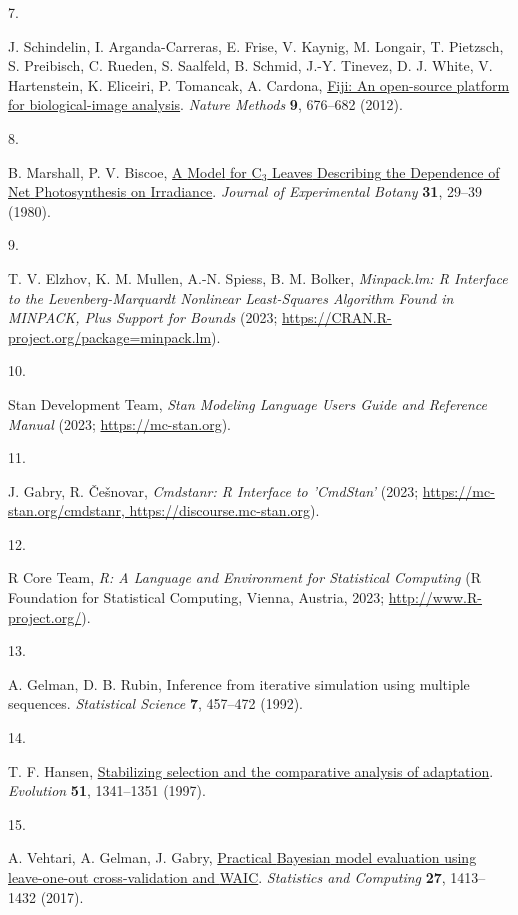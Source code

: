 \documentclass[
  letterpaper,
  DIV=11,
  numbers=noendperiod]{scrartcl}
\newlength{\cslhangindent}
\newlength{\csllabelwidth}
\newenvironment{CSLReferences}[2] %
 {\begin{list}{}{%
  \setlength{\itemindent}{0pt}
  \setlength{\leftmargin}{0pt}
  \setlength{\parsep}{0pt}
  \ifodd #1
   \setlength{\leftmargin}{\cslhangindent}
   \setlength{\itemindent}{-1\cslhangindent}
  \fi
  \setlength{\itemsep}{#2\baselineskip}}}
 {\end{list}}
\newcommand{\CSLLeftMargin}[1]{\parbox[t]{\csllabelwidth}{\strut#1\strut}}
\newcommand{\CSLRightInline}[1]{\parbox[t]{\linewidth - \csllabelwidth}{\strut#1\strut}}
\begin{document}
\begin{CSLReferences}{0}{1}
\CSLLeftMargin{7. }%
\CSLRightInline{J. Schindelin, I. Arganda-Carreras, E. Frise, V. Kaynig,
M. Longair, T. Pietzsch, S. Preibisch, C. Rueden, S. Saalfeld, B.
Schmid, J.-Y. Tinevez, D. J. White, V. Hartenstein, K. Eliceiri, P.
Tomancak, A. Cardona, \href{https://doi.org/10.1038/nmeth.2019}{Fiji: An
open-source platform for biological-image analysis}. \emph{Nature
Methods} \textbf{9}, 676--682 (2012).}

\CSLLeftMargin{8. }%
\CSLRightInline{B. Marshall, P. V. Biscoe,
\href{https://doi.org/10.1093/jxb/31.1.29}{A {Model} for
{C}\(_{\textrm{3}}\) {Leaves} {Describing} the {Dependence} of {Net}
{Photosynthesis} on {Irradiance}}. \emph{Journal of Experimental Botany}
\textbf{31}, 29--39 (1980).}

\CSLLeftMargin{9. }%
\CSLRightInline{T. V. Elzhov, K. M. Mullen, A.-N. Spiess, B. M. Bolker,
\emph{Minpack.lm: {R} {Interface} to the {Levenberg}-{Marquardt}
{Nonlinear} {Least}-{Squares} {Algorithm} {Found} in {MINPACK}, {Plus}
{Support} for {Bounds}} (2023;
\url{https://CRAN.R-project.org/package=minpack.lm}).}

\CSLLeftMargin{10. }%
\CSLRightInline{Stan Development Team, \emph{Stan {Modeling} {Language}
{Users} {Guide} and {Reference} {Manual}} (2023;
\url{https://mc-stan.org}).}

\CSLLeftMargin{11. }%
\CSLRightInline{J. Gabry, R. Češnovar, \emph{Cmdstanr: {R} {Interface}
to '{CmdStan}'} (2023;
\href{https://mc-stan.org/cmdstanr,\%20https://discourse.mc-stan.org}{https://mc-stan.org/cmdstanr,
https://discourse.mc-stan.org}).}

\CSLLeftMargin{12. }%
\CSLRightInline{R Core Team, \emph{R: {A} {Language} and {Environment}
for {Statistical} {Computing}} (R Foundation for Statistical Computing,
Vienna, Austria, 2023; \url{http://www.R-project.org/}).}

\CSLLeftMargin{13. }%
\CSLRightInline{A. Gelman, D. B. Rubin, Inference from iterative
simulation using multiple sequences. \emph{Statistical Science}
\textbf{7}, 457--472 (1992).}

\CSLLeftMargin{14. }%
\CSLRightInline{T. F. Hansen,
\href{https://doi.org/10.1111/j.1558-5646.1997.tb01457.x}{Stabilizing
selection and the comparative analysis of adaptation}. \emph{Evolution}
\textbf{51}, 1341--1351 (1997).}

\CSLLeftMargin{15. }%
\CSLRightInline{A. Vehtari, A. Gelman, J. Gabry,
\href{https://doi.org/10.1007/s11222-016-9696-4}{Practical {Bayesian}
model evaluation using leave-one-out cross-validation and {WAIC}}.
\emph{Statistics and Computing} \textbf{27}, 1413--1432 (2017).}

\end{CSLReferences}
\end{document}
